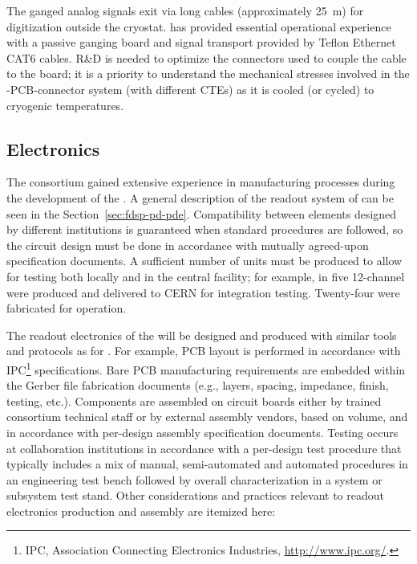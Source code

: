 
The ganged analog signals %
exit via long cables (approximately \SI{25}{m}) for digitization outside the cryostat.
 has provided essential operational experience with a passive ganging board and signal transport provided by Teflon Ethernet CAT6 cables.
R\&D is needed to optimize the connectors used to couple the cable to the board;  it is a priority to understand the mechanical stresses involved in the -PCB-connector system (with different CTEs) as it is cooled (or cycled) to cryogenic temperatures.


\subsection{Electronics}
\label{sec:fdsp-pd-assy-pde}

The  consortium gained extensive experience in manufacturing processes %
during the development of the  . %
A general description of the readout system of  can be seen in the Section~\ref{sec:fdsp-pd-pde}. Compatibility between elements designed by different institutions is guaranteed when standard procedures are followed, so the circuit design must be done in accordance with mutually agreed-upon specification documents.  A sufficient  number of units must be produced to allow %
for testing both locally and  in the central facility; for example, in  five 12-channel   were produced and delivered to CERN for integration testing. Twenty-four were fabricated for  operation. 

The readout electronics of the  will be designed and produced with similar tools and protocols as for  . For example, %
PCB layout is performed in accordance with IPC\footnote{IPC\texttrademark{}, Association Connecting Electronics Industries, \url{http://www.ipc.org/}.} specifications. Bare PCB manufacturing requirements are embedded within the Gerber file 
fabrication documents (e.g., layers, spacing, impedance, finish, testing, etc.). Components are assembled on circuit boards either by trained  consortium technical staff or by external assembly vendors, based on volume, and in accordance with per-design assembly specification documents. Testing occurs at %
collaboration institutions in accordance with a per-design test procedure that typically includes a mix of manual, semi-automated and automated procedures %
in an engineering test bench followed by overall characterization in a system or subsystem test stand.
Other considerations and practices relevant to readout electronics production and assembly are itemized here:

